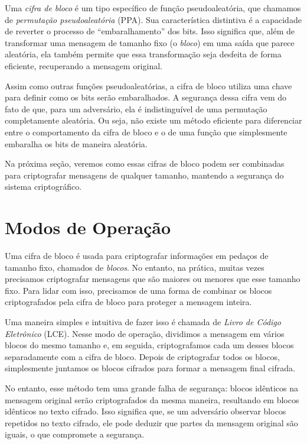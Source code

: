 Uma {\em cifra de bloco} é um tipo específico de função pseudoaleatória, que chamamos de {\em permutação pseudoaleatória} (PPA).
Sua característica distintiva é a capacidade de reverter o processo de ``embaralhamento'' dos bits.
Isso significa que, além de transformar uma mensagem de tamanho fixo (o {\em bloco}) em uma saída que parece aleatória, ela também permite que essa transformação seja desfeita de forma eficiente, recuperando a mensagem original.

Assim como outras funções pseudoaleatórias, a cifra de bloco utiliza uma chave para definir como os bits serão embaralhados.
A segurança dessa cifra vem do fato de que, para um adversário, ela é indistinguível de uma permutação completamente aleatória.
Ou seja, não existe um método eficiente para diferenciar entre o comportamento da cifra de bloco e o de uma função que simplesmente embaralha os bits de maneira aleatória.

Na próxima seção, veremos como essas cifras de bloco podem ser combinadas para criptografar mensagens de qualquer tamanho, mantendo a segurança do sistema criptográfico.

\section{Modos de Operação}
\label{sec:modos-de-operacao-bloco}

Uma cifra de bloco é usada para criptografar informações em pedaços de tamanho fixo, chamados de {\em blocos}.
No entanto, na prática, muitas vezes precisamos criptografar mensagens que são maiores ou menores que esse tamanho fixo.
Para lidar com isso, precisamos de uma forma de combinar os blocos criptografados pela cifra de bloco para proteger a mensagem inteira.

Uma maneira simples e intuitiva de fazer isso é chamada de {\em Livro de Código Eletrônico} (LCE).
Nesse modo de operação, dividimos a mensagem em vários blocos do mesmo tamanho e, em seguida, criptografamos cada um desses blocos separadamente com a cifra de bloco.
Depois de criptografar todos os blocos, simplesmente juntamos os blocos cifrados para formar a mensagem final cifrada.

No entanto, esse método tem uma grande falha de segurança:
blocos idênticos na mensagem original serão criptografados da mesma maneira, resultando em blocos idênticos no texto cifrado.
Isso significa que, se um adversário observar blocos repetidos no texto cifrado, ele pode deduzir que partes da mensagem original são iguais, o que compromete a segurança.

